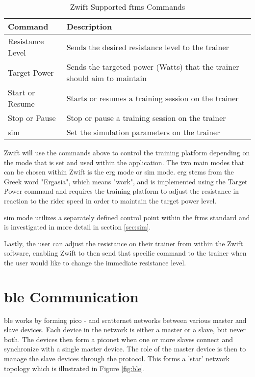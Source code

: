 \begin{table}[H]
	\renewcommand{\arraystretch}{\tablestretch}
	\centering
	\caption{Zwift Supported \ac{ftms} Commands}
	\begin{tabularx}{\textwidth}{ >{\raggedright}p{4cm} X}
		\toprule
		Command          & Description                                                              \\
		\midrule
		Resistance Level & Sends the desired resistance level to the trainer                        \\
		Target Power     & Sends the targeted power (Watts) that the trainer should aim to maintain \\
		Start or Resume  & Starts or resumes a training session on the trainer                      \\
		Stop or Pause    & Stop or pause a training session on the trainer                          \\
		\ac{sim}         & Set the simulation parameters on the trainer                             \\
		\bottomrule
	\end{tabularx}
	\label{tab:blreq}
\end{table}

Zwift will use the commands above to control the training platform depending on the mode that is set and used within the application. The two main modes that can be chosen within Zwift is the \acf{erg} mode or \acf{sim} mode. \ac{erg} stems from the Greek word "Ergasia", which means "work", and is implemented using the Target Power command and requires the training platform to adjust the resistance in reaction to the rider speed in order to maintain the target power level. \citep{Zwiftinsider:2022}

\ac{sim} mode utilizes a separately defined control point within the \ac{ftms} standard and is investigated in more detail in section \ref{sec:sim}.

Lastly, the user can adjust the resistance on their trainer from within the Zwift software, enabling Zwift to then send that specific command to the trainer when the user would like to change the immediate resistance level.

\section{\ac{ble} Communication}
\label{sec:ble}

\ac{ble} works by forming pico - and scatternet networks between various master and slave devices. Each device in the network is either a master or a slave, but never both. The devices then form a piconet when one or more slaves connect and synchronize with a single master device. The role of the master device is then to manage the slave devices through the protocol. This forms a 'star' network topology which is illustrated in Figure \ref{fig:ble}. \citep{Townsend:2014}

